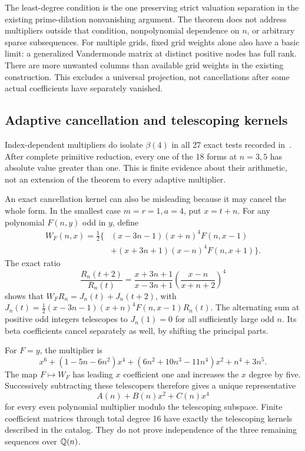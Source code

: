 The least-degree condition is the one preserving strict valuation
separation in the existing prime-dilation nonvanishing argument.
The theorem does not address multipliers outside that condition,
nonpolynomial dependence on $n$, or arbitrary sparse subsequences.
For multiple grids, fixed grid weights alone also have a basic limit:
a generalized Vandermonde matrix at distinct positive nodes has full
rank. There are more unwanted columns than available grid weights in
the existing construction. This excludes a universal projection, not
cancellations after some actual coefficients have separately vanished.

\subsection{Adaptive cancellation and telescoping kernels}
Index-dependent multipliers do isolate $\beta(4)$ in all 27 exact tests
recorded in~. After complete primitive reduction, every one of
the 18 forms at $n=3,5$ has absolute value greater than one. This is
finite evidence about their arithmetic, not an extension of the theorem
to every adaptive multiplier.

An exact cancellation kernel can also be misleading because it may
cancel the whole form. In the smallest case $m=r=1,a=4$, put $x=t+n$.
For any polynomial $F(n,y)$ odd in $y$, define
\begin{align*}
 W_F(n,x)=\tfrac12\{&(x-3n-1)(x+n)^4F(n,x-1)\\
                         &+(x+3n+1)(x-n)^4F(n,x+1)\}.
\end{align*}
The exact ratio
\[
 \frac{R_n(t+2)}{R_n(t)}
 =\frac{x+3n+1}{x-3n+1}\left(\frac{x-n}{x+n+2}\right)^4
\]
shows that $W_FR_n=J_n(t)+J_n(t+2)$, with
$J_n(t)=\tfrac12(x-3n-1)(x+n)^4F(n,x-1)R_n(t)$.
The alternating sum at positive odd integers telescopes to $J_n(1)=0$
for all sufficiently large odd $n$. Its beta coefficients cancel
separately as well, by shifting the principal parts.

For $F=y$, the multiplier is
\[
 x^6+(1-5n-6n^2)x^4+(6n^2+10n^3-11n^4)x^2+n^4+3n^5.
\]
The map $F\mapsto W_F$ has leading $x$ coefficient one and increases
the $x$ degree by five. Successively subtracting these telescopers
therefore gives a unique representative
\[
                       A(n)+B(n)x^2+C(n)x^4
\]
for every even polynomial multiplier modulo the telescoping subspace.
Finite coefficient matrices through total degree 16 have exactly the
telescoping kernels described in the catalog. They do not prove
independence of the three remaining sequences over $\mathbb Q(n)$.

